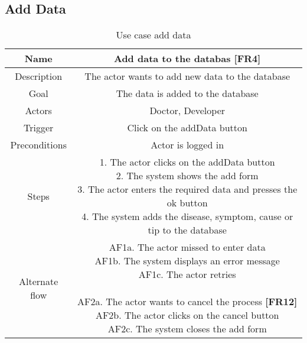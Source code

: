 \subsection{Add Data}
\begin{table}[H]
	\begin{center}\scriptsize
		\begin{tabular}{ |c|c| } 
			\hline	
			Name & Add data to the databas  \textbf{[FR4]} \\
			\hline
			Description & The actor wants to add new data to the database \\ 
			\hline
			Goal & The data is added to the database \\ 
			\hline
			Actors & Doctor, Developer \\ 
			\hline
			Trigger & Click on the addData button \\ 
			\hline
			Preconditions & Actor is logged in \\ 
			\hline
			Steps & \parbox{9cm}{\vspace{.5\baselineskip}
				1. The actor clicks on the addData button\\
				2. The system shows the add form\\
				3. The actor enters the required data and presses the ok button\\
				4. The system adds the disease, symptom, cause or tip to the database\\ } \\
			\hline
			Alternate flow & \parbox{9cm}{\vspace{.5\baselineskip}
				AF1a. The actor missed to enter data\\
				AF1b. The system displays an error message\\
				AF1c. The actor retries\\\\
				AF2a. The actor wants to cancel the process \textbf{[FR12]}\\
				AF2b. The actor clicks on the cancel button\\
				AF2c. The system closes the add form}\\ 
			\hline
		\end{tabular}
	\end{center}\normalsize
	\caption{Use case add data}
\end{table}

